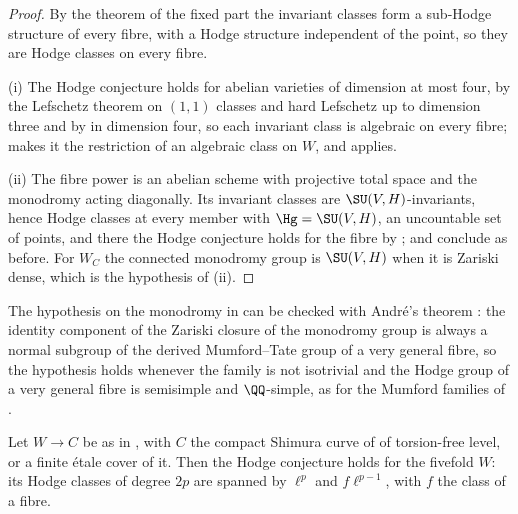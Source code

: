 \begin{proof}
By the theorem of the fixed part the invariant classes form a sub-Hodge
structure of every fibre, with a Hodge structure independent of the point, so
they are Hodge classes on every fibre.

(i) The Hodge conjecture holds for abelian varieties of dimension at most
four, by the Lefschetz theorem on $(1,1)$ classes and hard Lefschetz up to
dimension three and by \cite{Mar25a} in dimension four, so each invariant
class is algebraic on every fibre;  makes it the
restriction of an algebraic class on $W$, and 
applies.

(ii) The fibre power is an abelian scheme with projective total space and
the monodromy acting diagonally. Its invariant classes are
$\SU(V,H)$-invariants, hence Hodge classes at every member with
$\Hg=\SU(V,H)$, an uncountable set of points, and there the Hodge conjecture
holds for the fibre by ;  and
 conclude as before. For $W_{C}$ the connected
monodromy group is $\SU(V,H)$ when it is Zariski dense, which is the
hypothesis of (ii).
\end{proof}

The hypothesis on the monodromy in  can be checked
with Andr\'e's theorem \cite[Theorem~1]{And92}: the identity component of the
Zariski closure of the monodromy group is always a normal subgroup of the
derived Mumford--Tate group of a very general fibre, so the hypothesis holds
whenever the family is not isotrivial and the Hodge group of a very general
fibre is semisimple and $\QQ$-simple, as for the Mumford families of
.

\begin{proposition}
\label{prop:mumfordfivefold}
Let $W\to C$ be as in , with $C$ the compact
Shimura curve of \cite{Mum69} of torsion-free level, or a finite \'etale cover
of it. Then the Hodge conjecture holds for the fivefold $W$: its Hodge classes
of degree $2p$ are spanned by $\ell^{p}$ and $f\ell^{p-1}$, with $f$ the class
of a fibre.
\end{proposition}

